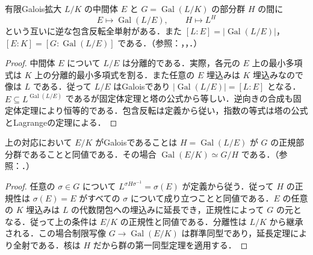 \begin{prop}[Galois対応の基本定理]
有限Galois拡大 $L/K$ の中間体 $E$ と $G=\operatorname{Gal}(L/K)$ の部分群 $H$ の間に
\[
 E\longmapsto\operatorname{Gal}(L/E),\qquad H\longmapsto L^H
\]
という互いに逆な包含反転全単射がある．また $[L:E]=|\operatorname{Gal}(L/E)|$，$[E:K]=[G:\operatorname{Gal}(L/E)]$ である．（参照：，，．）
\end{prop}
\begin{proof}
中間体 $E$ について $L/E$ は分離的である．実際，各元の $E$ 上の最小多項式は $K$ 上の分離的最小多項式を割る．また任意の $E$ 埋込みは $K$ 埋込みなので像は $L$ である．従って $L/E$ はGaloisであり $|\operatorname{Gal}(L/E)|=[L:E]$ となる．$E\subseteq L^{\operatorname{Gal}(L/E)}$ であるが固定体定理と塔の公式から等しい．逆向きの合成も固定体定理により恒等的である．包含反転は定義から従い，指数の等式は塔の公式とLagrangeの定理による．
\end{proof}
\begin{prop}[正規部分群と中間体のGalois性]
上の対応において $E/K$ がGaloisであることは $H=\operatorname{Gal}(L/E)$ が $G$ の正規部分群であることと同値である．その場合 $\operatorname{Gal}(E/K)\simeq G/H$ である．（参照：．）
\end{prop}
\begin{proof}
任意の $\sigma\in G$ について $L^{\sigma H\sigma^{-1}}=\sigma(E)$ が定義から従う．従って $H$ の正規性は $\sigma(E)=E$ がすべての $\sigma$ について成り立つことと同値である．$E$ の任意の $K$ 埋込みは $L$ の代数閉包への埋込みに延長でき，正規性によって $G$ の元となる．従って上の条件は $E/K$ の正規性と同値である．分離性は $L/K$ から継承される．この場合制限写像 $G\to\operatorname{Gal}(E/K)$ は群準同型であり，延長定理により全射である．核は $H$ だから群の第一同型定理を適用する．
\end{proof}
